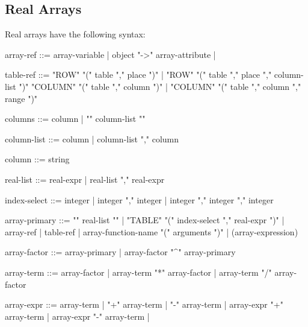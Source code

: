 \subsection{Real Arrays}
\label{sec:realarray}
Real arrays have the following syntax:
\begin{footnotesize}
\begin{example}
array-ref     ::= array-variable |
                  object "->" array-attribute |

table-ref     ::= "ROW" "(" table "," place ")" |
                  "ROW" "(" table "," place "," column-list ")"
                  "COLUMN" "(" table "," column ")" |
                  "COLUMN" "(" table "," column "," range ")"

columns       ::= column |
                  "{" column-list "}"

column-list   ::= column |
                  column-list "," column

column        ::= string

real-list     ::= real-expr |
                  real-list "," real-expr

index-select  ::= integer |
                  integer "," integer |
                  integer "," integer "," integer

array-primary ::= "{" real-list "}" |
                  "TABLE" "(" index-select "," real-expr ")" |
                  array-ref |
                  table-ref |
                  array-function-name "(" arguments ")" |
                  (array-expression)

array-factor  ::= array-primary |
                  array-factor "^" array-primary

array-term    ::= array-factor |
                  array-term "*" array-factor |
                  array-term "/" array-factor

array-expr    ::= array-term |
                  "+" array-term |
                  "-" array-term |
                  array-expr "+" array-term |
                  array-expr "-" array-term |
\end{example}
\end{footnotesize}

